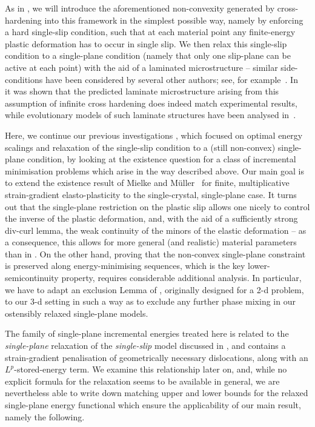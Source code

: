 \documentclass[11pt,reqno]{amsart}
\theoremstyle{plain}
\theoremstyle{definition}
\theoremstyle{remark}
\begin{document}
As in \cite{ang,ang2}, we will introduce the aforementioned non-convexity generated by cross-hardening into this framework in the simplest possible way, namely by enforcing a hard single-slip condition, such that at each material point any finite-energy plastic deformation has to occur in single slip. We then relax this single-slip condition to a single-plane condition (namely that only one slip-plane can be active at each point) with the aid of a laminated microstructure -- similar side-conditions have been considered by several other authors; see, for example~\cite{dolz,dolz2}. In~\cite{dm} it was shown that the predicted laminate microstructure arising from this assumption of infinite cross hardening does indeed match experimental results, while evolutionary models of such laminate structures have been analysed in~\cite{Hackl1, Hackl2}.

Here, we continue our previous investigations \cite{ang,ang2}, which focused on optimal energy scalings and relaxation of the single-slip condition to a (still non-convex) single-plane condition, by looking at the existence question for a class of incremental minimisation problems which arise in the way described above. Our main goal is to extend the existence result of Mielke and M\"uller~\cite{MM} for finite, multiplicative strain-gradient elasto-plasticity to the single-crystal, single-plane case. It turns out that the single-plane restriction on the plastic slip allows one nicely to control the inverse of the plastic deformation, and, with the aid of a sufficiently strong div-curl lemma, the weak continuity of the minors of the elastic deformation -- as a consequence, this allows for more general (and realistic) material parameters than in \cite{MM}. On the other hand, proving that the non-convex single-plane constraint is preserved along energy-minimising sequences, which is the key lower-semicontinuity property, requires considerable additional analysis. In particular, we have to adapt an exclusion Lemma of \cite{co}, originally designed for a 2-d problem, to our 3-d setting in such a way as to exclude any further phase mixing in our ostensibly relaxed single-plane models.

The family of single-plane incremental energies treated here is related to the {\em single-plane} relaxation of the {\em  single-slip} model discussed in \cite{ang,ang2}, and contains a strain-gradient penalisation of geometrically necessary dislocations, along with an $L^p$-stored-energy term. We examine this relationship later on, and, while no explicit formula for the relaxation seems to be available in general, we are nevertheless able to write down matching upper and lower bounds for the relaxed single-plane energy functional which ensure the applicability of our main result, namely the following. 
\end{document}
